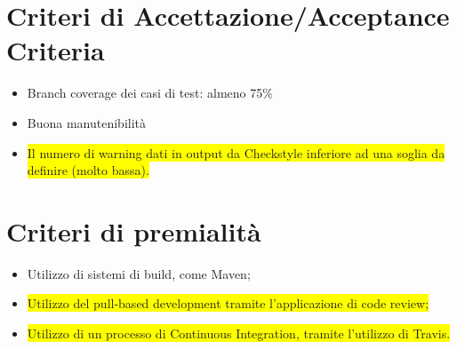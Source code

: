 \documentclass[12pt]{article}
\begin{document}
  \section{Criteri di Accettazione/Acceptance Criteria}
  \begin{itemize}
      \item Branch coverage dei casi di test: almeno 75\%
      \item Buona manutenibilità
      \item \colorbox{yellow}{Il numero di warning dati in output da Checkstyle inferiore ad una soglia da definire (molto bassa).}
  \end{itemize}
  
  \section{Criteri di premialità}
  
  \begin{itemize}
      \item Utilizzo di sistemi di build, come Maven;
      \item \colorbox{yellow}{Utilizzo del pull-based development tramite l’applicazione di code review;}
      \item \colorbox{yellow}{Utilizzo di un processo di Continuous Integration, tramite l’utilizzo di Travis.}
  \end{itemize}
\end{document}
